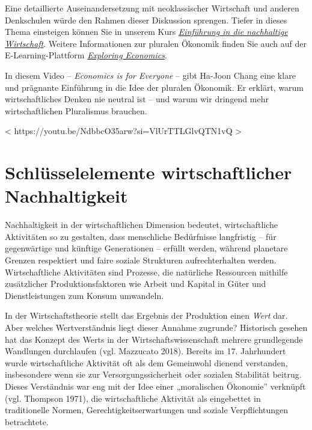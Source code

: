 \documentclass[
  nswissgerman,
  a4paper,
  openany]{book}
\begin{document}
\begin{tcolorbox}
Eine detaillierte Auseinandersetzung mit neoklassischer Wirtschaft und
anderen Denkschulen würde den Rahmen dieser Diskussion sprengen. Tiefer
in dieses Thema einsteigen können Sie in unserem Kurs
\href{https://cdeteaching.github.io/SP_SustainableEconomics/}{\emph{Einführung
in die nachhaltige Wirtschaft}}. Weitere Informationen zur pluralen
Ökonomik finden Sie auch auf der E-Learning-Plattform
\href{https://www.exploring-economics.org/en/}{\emph{Exploring
Economics}}.

In diesem Video -- \emph{Economics is for Everyone} -- gibt Ha-Joon
Chang eine klare und prägnante Einführung in die Idee der pluralen
Ökonomik. Er erklärt, warum wirtschaftliches Denken nie neutral ist --
und warum wir dringend mehr wirtschaftlichen Pluralismus brauchen.

{{< https://youtu.be/NdbbcO35arw?si=VlUrTTLGlvQTN1vQ >}}

\end{tcolorbox}

\section{Schlüsselelemente wirtschaftlicher
Nachhaltigkeit}\label{schluxfcsselelemente-wirtschaftlicher-nachhaltigkeit}

Nachhaltigkeit in der wirtschaftlichen Dimension bedeutet,
wirtschaftliche Aktivitäten so zu gestalten, dass menschliche
Bedürfnisse langfristig -- für gegenwärtige und künftige Generationen --
erfüllt werden, während planetare Grenzen respektiert und faire soziale
Strukturen aufrechterhalten werden. Wirtschaftliche Aktivitäten sind
Prozesse, die natürliche Ressourcen mithilfe zusätzlicher
Produktionsfaktoren wie Arbeit und Kapital in Güter und Dienstleistungen
zum Konsum umwandeln.

In der Wirtschaftstheorie stellt das Ergebnis der Produktion einen
\emph{Wert} dar. Aber welches Wertverständnis liegt dieser Annahme
zugrunde? Historisch gesehen hat das Konzept des Werts in der
Wirtschaftswissenschaft mehrere grundlegende Wandlungen durchlaufen
(vgl. Mazzucato 2018). Bereits im 17. Jahrhundert wurde wirtschaftliche
Aktivität oft als dem Gemeinwohl dienend verstanden, insbesondere wenn
sie zur Versorgungssicherheit oder sozialen Stabilität beitrug. Dieses
Verständnis war eng mit der Idee einer „moralischen Ökonomie'' verknüpft
(vgl. Thompson 1971), die wirtschaftliche Aktivität als eingebettet in
traditionelle Normen, Gerechtigkeitserwartungen und soziale
Verpflichtungen betrachtete.
\end{document}
